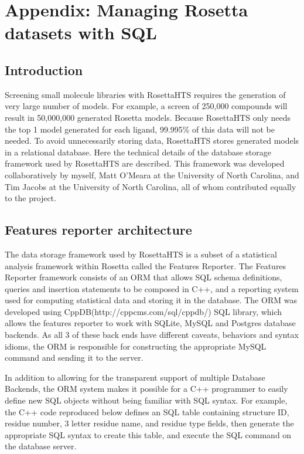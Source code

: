 \chapter{Appendix: Managing Rosetta datasets with SQL}

\section{Introduction}

Screening small molecule libraries with RosettaHTS requires the generation of very large number of models. 
For example, a screen of 250,000 compounds will result in 50,000,000 generated Rosetta models.
Because RosettaHTS only needs the top 1 model generated for each ligand, 99.995\% of this data will not be needed.
To avoid unnecessarily storing data, RosettaHTS stores generated models in a relational database.
Here  the technical details of the database storage framework used by RosettaHTS are described.
This framework was developed collaboratively by myself, Matt O'Meara at the University of North Carolina, and Tim Jacobs at the University of North Carolina, all of whom contributed equally to the project. 

\section{Features reporter architecture}

The data storage framework used by RosettaHTS is a subset of a statistical analysis framework within Rosetta called the Features Reporter.
The Features Reporter framework consists of an \ac{ORM} that allows \ac{SQL} schema definitions, queries and insertion statements to be composed in C++, and a reporting system used for computing statistical data and storing it in the database.
The \ac{ORM} was developed using CppDB(http://cppcms.com/sql/cppdb/) \ac{SQL} library, which allows the features reporter to work with SQLite, MySQL and Postgres database backends.
As all 3 of these back ends have different caveats, behaviors and syntax idioms, the \ac{ORM} is responsible for constructing the appropriate MySQL command and sending it to the server.

In addition to allowing for the transparent support of multiple Database Backends, the \ac{ORM} system makes it possible for a C++ programmer to easily define new \ac{SQL} objects without being familiar with \ac{SQL} syntax. 
For example, the C++ code reproduced below defines an \ac{SQL} table containing structure ID, residue number, 3 letter residue name, and residue type fields, then generate the appropriate \ac{SQL} syntax to create this table, and execute the \ac{SQL} command on the database server.

